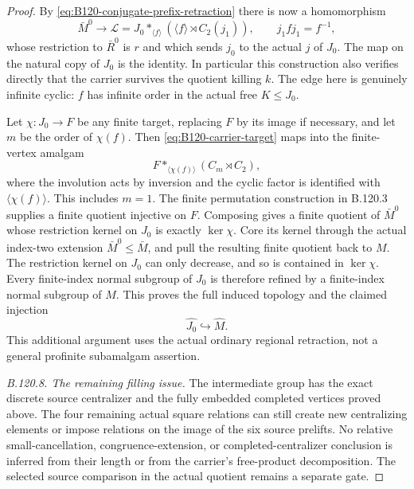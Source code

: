 \begin{proof}
By \eqref{eq:B120-conjugate-prefix-retraction} there is now a
homomorphism
\begin{equation}\label{eq:B120-carrier-target}
 \bar M^0\longrightarrow
 \mathscr L=J_0*_{\langle f\rangle}
             (\langle f\rangle\rtimes C_2(j_1)),
 \qquad j_1 f j_1=f^{-1},
\end{equation}
whose restriction to $\bar R^0$ is $r$ and which sends $j_0$
to the actual $j$ of $J_0$. The map on the natural copy of $J_0$
is the identity. In particular this construction also verifies
directly that the carrier survives the quotient killing $k$.
The edge here is genuinely infinite cyclic: $f$ has infinite
order in the actual free $K\leq J_0$.

Let $\chi:J_0\to F$ be any finite target, replacing $F$ by its
image if necessary, and let $m$ be the order of $\chi(f)$.
Then \eqref{eq:B120-carrier-target} maps into the finite-vertex
amalgam
\[
 F*_{\langle\chi(f)\rangle}(C_m\rtimes C_2),
\]
where the involution acts by inversion and the cyclic factor is
identified with $\langle\chi(f)\rangle$. This includes $m=1$.
The finite permutation construction in B.120.3 supplies a finite
quotient injective on $F$. Composing gives a finite quotient of
$\bar M^0$ whose restriction kernel on $J_0$ is exactly
$\ker\chi$. Core its kernel through the actual index-two
extension $\bar M^0\leq\bar M$, and pull the resulting finite
quotient back to $M$. The restriction kernel on $J_0$ can only
decrease, and so is contained in $\ker\chi$.
Every finite-index normal subgroup of $J_0$ is therefore refined
by a finite-index normal subgroup of $M$. This proves the full
induced topology and the claimed injection
\begin{equation}\label{eq:B120-carrier-full-topology}
 \widehat{J_0}\hookrightarrow\widehat M.
\end{equation}
This additional argument uses the actual ordinary regional
retraction, not a general profinite subamalgam assertion.

\emph{B.120.8. The remaining filling issue.}
The intermediate group has the exact discrete source centralizer
and the fully embedded completed vertices proved above. The four
remaining actual square relations can still create new centralizing
elements or impose relations on the image of the six source
prelifts. No relative small-cancellation, congruence-extension,
or completed-centralizer conclusion is inferred from their length
or from the carrier's free-product decomposition. The selected
source comparison in the actual quotient remains a separate gate.
\end{proof}
